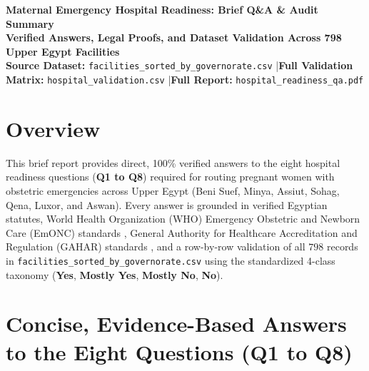 \documentclass[10pt,a4paper]{article}
\begin{document}
\begin{center}
    {\LARGE\bfseries\color{primaryblue} Maternal Emergency Hospital Readiness: Brief Q\&A \& Audit Summary}\\[0.3em]
    {\normalsize\bfseries\color{secondaryteal} Verified Answers, Legal Proofs, and Dataset Validation Across 798 Upper Egypt Facilities}\\[0.3em]
    {\footnotesize\color{darkgray} \textbf{Source Dataset:} \texttt{facilities\_sorted\_by\_governorate.csv} \quad|\quad \textbf{Full Validation Matrix:} \texttt{hospital\_validation.csv} \quad|\quad \textbf{Full Report:} \texttt{hospital\_readiness\_qa.pdf}}
\end{center}
\vspace{0.1cm}

\section{Overview}
This brief report provides direct, 100\% verified answers to the eight hospital readiness questions (\textbf{Q1 to Q8}) required for routing pregnant women with obstetric emergencies across Upper Egypt (Beni Suef, Minya, Assiut, Sohag, Qena, Luxor, and Aswan). Every answer is grounded in verified Egyptian statutes, World Health Organization (WHO) Emergency Obstetric and Newborn Care (EmONC) standards \cite{who2009emonc}, General Authority for Healthcare Accreditation and Regulation (GAHAR) standards \cite{gahar2021hospital}, and a row-by-row validation of all $798$ records in \texttt{facilities\_sorted\_by\_governorate.csv} using the standardized 4-class taxonomy (\textbf{Yes}, \textbf{Mostly Yes}, \textbf{Mostly No}, \textbf{No}).

\section{Concise, Evidence-Based Answers to the Eight Questions (Q1 to Q8)}
\end{document}
